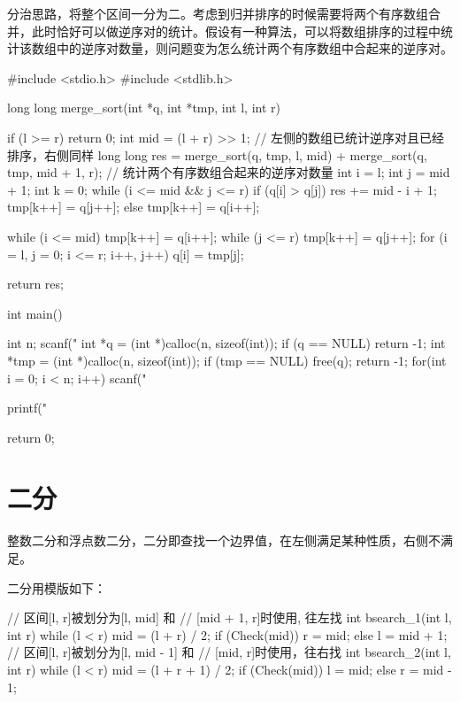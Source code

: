 分治思路，将整个区间一分为二。考虑到归并排序的时候需要将两个有序数组合并，此时恰好可以做逆序对的统计。假设有一种算法，可以将数组排序的过程中统计该数组中的逆序对数量，则问题变为怎么统计两个有序数组中合起来的逆序对。

\begin{mycpptwocol}[归并排序计算逆序对数量]
#include <stdio.h>
#include <stdlib.h>

long long merge_sort(int *q, int *tmp,
                     int l, int r) {
    if (l >= r) {
        return 0;
    }
    int mid = (l + r) >> 1;
    // 左侧的数组已统计逆序对且已经排序，右侧同样
    long long res = merge_sort(q, tmp, l, mid) + merge_sort(q, tmp, mid + 1, r);
    // 统计两个有序数组合起来的逆序对数量
    int i = l;
    int j = mid + 1;
    int k = 0;
    while (i <= mid && j <= r) {
        if (q[i] > q[j]) {
            res += mid - i + 1;
            tmp[k++] = q[j++];
        } else {
            tmp[k++] = q[i++];
        }
    }
    
    while (i <= mid) {
        tmp[k++] = q[i++];
    }
    while (j <= r) {
        tmp[k++] = q[j++];
    }
    for (i = l, j = 0; i <= r;
         i++, j++) {
        q[i] = tmp[j];
    }
    
    return res;
}

int main()
{
    int n;
    scanf("%
    int *q = (int *)calloc(n, sizeof(int));
    if (q == NULL) {
        return -1;
    }
    int *tmp = (int *)calloc(n, sizeof(int));
    if (tmp == NULL) {
        free(q);
        return -1;
    }
    for(int i = 0; i < n; i++) {
        scanf("%
    }
    
    printf("%

    return 0;
}
\end{mycpptwocol}
\section{二分}
整数二分和浮点数二分，二分即查找一个边界值，在左侧满足某种性质，右侧不满足。

二分用模版如下：
\begin{mycpptwocol}[二分模版]
// 区间[l, r]被划分为[l, mid] 和
// [mid + 1, r]时使用, 往左找
int bsearch_1(int l, int r)
{
    while (l < r) {
        mid = (l + r) / 2;
        if (Check(mid)) {
            r = mid;
        } else {
            l = mid + 1;
        }
    }
}
// 区间[l, r]被划分为[l, mid - 1] 和
// [mid, r]时使用，往右找
int bsearch_2(int l, int r)
{
    while (l < r) {
        mid = (l + r + 1) / 2;
        if (Check(mid)) {
            l = mid;
        } else {
            r = mid - 1;
        }
    }
}
\end{mycpptwocol}

